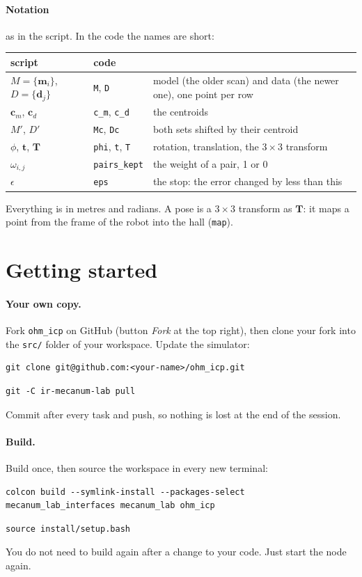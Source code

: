 \documentclass[11pt,a4paper,parskip=half]{scrartcl}
\newcommand{\thema}[1]{\texttt{#1}}
\newcommand{\datei}[1]{\texttt{#1}}
\newcommand{\matsym}[1]{\mathbf{#1}}
\renewcommand{\vec}[1]{\mathbf{#1}}
\begin{document}
\paragraph{Notation} as in the script. In the code the names are short:
\begin{center}\small
\begin{tabular}{@{}lll@{}}
\toprule
script & code & \\
\midrule
\(M = \{\vec m_i\}\), \(D = \{\vec d_j\}\) & \thema{M}, \thema{D} & model (the older scan) and data (the newer one), one point per row \\
\(\vec c_m\), \(\vec c_d\) & \thema{c\_m}, \thema{c\_d} & the centroids \\
\(M'\), \(D'\) & \thema{Mc}, \thema{Dc} & both sets shifted by their centroid \\
\(\phi\), \(\vec t\), \(\matsym{T}\) & \thema{phi}, \thema{t}, \thema{T} & rotation, translation, the \(3\times3\) transform \\
\(\omega_{i,j}\) & \thema{pairs\_kept} & the weight of a pair, 1 or 0 \\
\(\epsilon\) & \thema{eps} & the stop: the error changed by less than this \\
\bottomrule
\end{tabular}
\end{center}
Everything is in metres and radians. A pose is a \(3\times3\) transform as \(\matsym{T}\): it maps a point
from the frame of the robot into the hall (\thema{map}).

\newpage
\section{Getting started}
\paragraph{Your own copy.} Fork \datei{ohm\_icp} on GitHub (button \emph{Fork} at the top right), then clone
your fork into the \datei{src/} folder of your workspace. Update the simulator:
\begin{lstlisting}
git clone git@github.com:<your-name>/ohm_icp.git
\end{lstlisting}
\begin{lstlisting}
git -C ir-mecanum-lab pull
\end{lstlisting}
Commit after every task and push, so nothing is lost at the end of the session.

\paragraph{Build.} Build once, then source the workspace in every new terminal:
\begin{lstlisting}
colcon build --symlink-install --packages-select mecanum_lab_interfaces mecanum_lab ohm_icp
\end{lstlisting}
\begin{lstlisting}
source install/setup.bash
\end{lstlisting}
You do not need to build again after a change to your code. Just start the node again.
\end{document}
